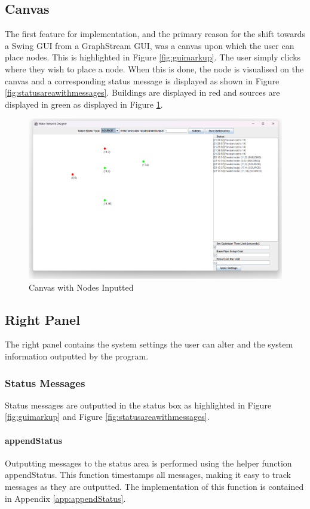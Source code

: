 \subsection{Canvas}
The first feature for implementation, and the primary reason for the shift towards a Swing GUI from a GraphStream GUI, was a canvas upon which the user can place nodes. This is highlighted in Figure \ref{fig:guimarkup}. The user simply clicks where they wish to place a node. When this is done, the node is visualised on the canvas and a corresponding status message is displayed as shown in Figure \ref{fig:statusareawithmessages}. 
Buildings are displayed in red and sources are displayed in green as displayed in Figure \ref{fig:canvaswithnodes}.
\begin{figure}[H]
    \centering
    \includegraphics[width=1.0\linewidth]{canvaswithnodes.png}
    \caption{Canvas with Nodes Inputted}
    \label{fig:canvaswithnodes}
\end{figure}

\subsection{Right Panel}
The right panel contains the system settings the user can alter and the system information outputted by the program.

\subsubsection{Status Messages}
Status messages are outputted in the status box as highlighted in Figure \ref{fig:guimarkup} and Figure \ref{fig:statusareawithmessages}.

\paragraph{appendStatus}
Outputting messages to the status area is performed using the helper function appendStatus. This function timestamps all messages, making it easy to track messages as they are outputted. The implementation of this function is contained in Appendix \ref{app:appendStatus}.

